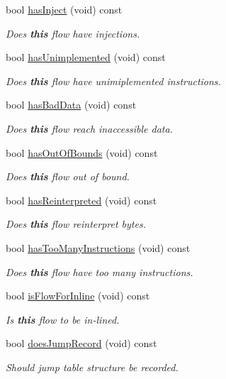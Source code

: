 \begin{DoxyCompactItemize}
bool \mbox{\hyperlink{class_flow_info_a36a38cdf15f8d2f4eb985c6adfa71e5f}{has\+Inject}} (void) const
\begin{DoxyCompactList}\small\item\em Does {\bfseries{this}} flow have injections. \end{DoxyCompactList}\item 
bool \mbox{\hyperlink{class_flow_info_ab18097b31e5b59b13075742866790dde}{has\+Unimplemented}} (void) const
\begin{DoxyCompactList}\small\item\em Does {\bfseries{this}} flow have unimiplemented instructions. \end{DoxyCompactList}\item 
bool \mbox{\hyperlink{class_flow_info_ad7335051bdbd437701f50bf6dd6bba59}{has\+Bad\+Data}} (void) const
\begin{DoxyCompactList}\small\item\em Does {\bfseries{this}} flow reach inaccessible data. \end{DoxyCompactList}\item 
bool \mbox{\hyperlink{class_flow_info_a95e57a20f50cfb17893aeac952bbb85b}{has\+Out\+Of\+Bounds}} (void) const
\begin{DoxyCompactList}\small\item\em Does {\bfseries{this}} flow out of bound. \end{DoxyCompactList}\item 
bool \mbox{\hyperlink{class_flow_info_ab2747c50a51625710d9267ee9e87ec03}{has\+Reinterpreted}} (void) const
\begin{DoxyCompactList}\small\item\em Does {\bfseries{this}} flow reinterpret bytes. \end{DoxyCompactList}\item 
bool \mbox{\hyperlink{class_flow_info_aacc03c27e4386bab78565b58f8ec33c9}{has\+Too\+Many\+Instructions}} (void) const
\begin{DoxyCompactList}\small\item\em Does {\bfseries{this}} flow have too many instructions. \end{DoxyCompactList}\item 
bool \mbox{\hyperlink{class_flow_info_a93657dc63253335308481daf7ed3c7e3}{is\+Flow\+For\+Inline}} (void) const
\begin{DoxyCompactList}\small\item\em Is {\bfseries{this}} flow to be in-\/lined. \end{DoxyCompactList}\item 
bool \mbox{\hyperlink{class_flow_info_a62850410634545f7feeb7fd08ca1814c}{does\+Jump\+Record}} (void) const
\begin{DoxyCompactList}\small\item\em Should jump table structure be recorded. \end{DoxyCompactList}\end{DoxyCompactItemize}


